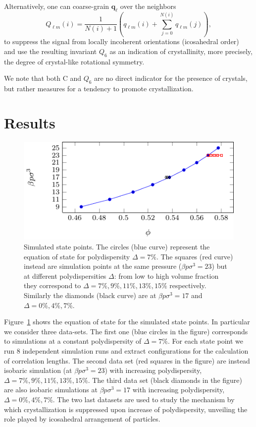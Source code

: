 \documentclass[twocolumn,superscriptaddress]{revtex4}
\begin{document}
Alternatively, one can coarse-grain $\mathbf{q}_\ell$ over the neighbors~\cite{lechner}
\begin{equation}
	Q_{\ell m}(i) = \frac{1}{N(i)+1}\left( q_{\ell m}(i) +  \sum_{j=0}^{N(i)} q_{\ell m}(j)\right), 
	\label{eq:Qlm}
\end{equation}
to suppress the signal from locally incoherent orientations (icosahedral order)~\cite{mathieu_icosahedra} and use the resulting invariant $Q_6$ as an indication of crystallinity, more precisely, the degree of crystal-like rotational symmetry.

We note that both $\text{C}$ and $Q_6$ are no direct indicator for the presence of crystals, but rather measures for a tendency to promote crystallization.

\section{Results}\label{sec:results}

\begin{figure}
 \centering
 \includegraphics{fig_eos}
 \caption{Simulated state points. The circles (blue curve) represent the equation of state for polydispersity $\Delta=7\%$. The squares (red curve) instead are simulation points at the same pressure ($\beta p\sigma^3=23$) but at different polydispersities $\Delta$: from low to high volume fraction they correspond to $\Delta=7\%,9\%,11\%,13\%,15\%$ respectively. Similarly the diamonds (black curve) are at $\beta p\sigma^3=17$ and $\Delta=0\%,4\%,7\%$.}
 \label{fig:eos}
\end{figure}


Figure~\ref{fig:eos} shows the equation of state for the simulated state points. In particular
we consider three data-sets. The first one (blue circles in the figure) corresponds to
simulations at a constant polydispersity of $\Delta=7\%$. For each state point we run $8$ independent
simulation runs and extract configurations for the calculation of correlation lengths.
The second data set (red squares in the figure) are instead isobaric simulation (at $\beta p\sigma^3=23$)
with increasing polydispersity, $\Delta=7\%,9\%,11\%,13\%,15\%$. The third data set (black diamonds in the figure) are also isobaric simulations at $\beta p\sigma^3=17$ with increasing polydispersity, $\Delta=0\%,4\%,7\%$. The two last datasets are used to study
the mechanism by which crystallization is suppressed upon increase of polydispersity, unveiling the
role played by icosahedral arrangement of particles.
\end{document}
